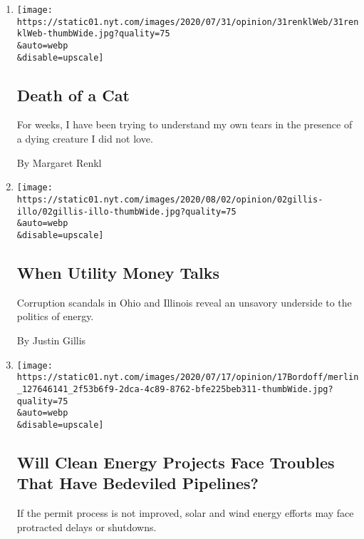 \begin{enumerate}
\def\labelenumi{\arabic{enumi}.}
\item
  \href{/2020/08/03/opinion/feral-cat-dying.html}{}

  \texttt{[image: https://static01.nyt.com/images/2020/07/31/opinion/31renklWeb/31renklWeb-thumbWide.jpg?quality=75\\\&auto=webp\\\&disable=upscale]}

  \hypertarget{death-of-a-cat}{%
  \subsection{Death of a Cat}\label{death-of-a-cat}}

  For weeks, I have been trying to understand my own tears in the
  presence of a dying creature I did not love.

  By Margaret Renkl
\item
  \href{/2020/08/02/opinion/utility-corruption-energy.html}{}

  \texttt{[image: https://static01.nyt.com/images/2020/08/02/opinion/02gillis-illo/02gillis-illo-thumbWide.jpg?quality=75\\\&auto=webp\\\&disable=upscale]}

  \hypertarget{when-utility-money-talks}{%
  \subsection{When Utility Money Talks}\label{when-utility-money-talks}}

  Corruption scandals in Ohio and Illinois reveal an unsavory underside
  to the politics of energy.

  By Justin Gillis
\item
  \href{/2020/07/20/opinion/pipelines-clean-energy.html}{}

  \texttt{[image: https://static01.nyt.com/images/2020/07/17/opinion/17Bordoff/merlin\_127646141\_2f53b6f9-2dca-4c89-8762-bfe225beb311-thumbWide.jpg?quality=75\\\&auto=webp\\\&disable=upscale]}

  \hypertarget{will-clean-energy-projects-face-troubles-that-have-bedeviled-pipelines}{%
  \subsection{Will Clean Energy Projects Face Troubles That Have
  Bedeviled
  Pipelines?}\label{will-clean-energy-projects-face-troubles-that-have-bedeviled-pipelines}}

  If the permit process is not improved, solar and wind energy efforts
  may face protracted delays or shutdowns.


\end{enumerate}

